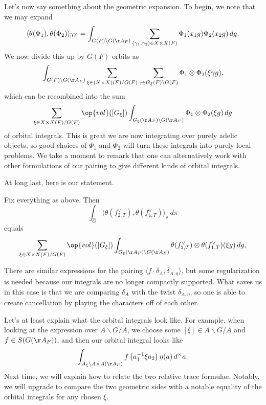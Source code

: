 \documentclass[../notes.tex]{subfiles}
\begin{document}
Let's now say something about the geometric expansion. To begin, we note that we may expand
\[\langle\theta(\Phi_1),\theta(\Phi_2)\rangle_{[G]}=\int_{G(F)\backslash G(\AA_F)}\sum_{(\gamma_1,\gamma_2)\in X\times X(F)}\Phi_1(x_1g)\Phi_2(x_2g)\,dg.\]
We now divide this up by $G(F)$ orbits as
\[\int_{G(F)\backslash G(\AA_F)}\sum_{\xi\in(X\times X)(F)/G(F)}\sum_{\gamma\in G_\xi(F)\backslash G(F)}\Phi_1\otimes\Phi_2(\xi\gamma g),\]
which can be recombined into the sum
\[\sum_{\xi\in X\times X(F)/G(F)}\op{vol}([G_\xi])\int_{G_\xi(\AA_F)\backslash G(\AA_F)}\Phi_1\otimes\Phi_2(\xi g)\,dg\]
of orbital integrals. This is great we are now integrating over purely adelic objects, so good choices of $\Phi_1$ and $\Phi_2$ will turn these integrals into purely local problems. We take a moment to remark that one can alternatively work with other formulations of our pairing to give different kinds of orbital integrals.

At long last, here is our statement.
\begin{theorem}
	Fix everything as above. Then
	\[\int_{\widehat G}\langle\theta(f_{2,T}^\lor),\theta(f_{1,T}^\lor)\rangle_\pi\,d\pi\]
	equals
	\[\sum_{\xi\in X\times X(F)/G(F)}\op{vol}([G_\xi])\int_{G_\xi(\AA_F)\backslash G(\AA_F)}\theta(f_{2,T}^\lor)\otimes\theta(f_{1,T}^\lor)(\xi g)\,dg,\]
\end{theorem}
There are similar expressions for the pairing $\langle f\cdot\delta_A,\delta_{A,\eta}\rangle$, but some regularization is needed because our integrals are no longer compactly supported. What saves us in this case is that we are comparing $\delta_A$ with the twist $\delta_{A,\eta}$, so one is able to create cancellation by playing the characters off of each other.

Let's at least explain what the orbital integrals look like. For example, when looking at the expression over $A\backslash G/A$, we choose some $[\xi]\in A\backslash G/A$ and $f\in S(G(\AA_F))$, and then our orbital integral looks like
\[\int_{A_\xi\backslash A\times A(\AA_F)}f\left(a_1^{-1}\xi a_2\right)\eta(a)\,d^\times a.\]
Next time, we will explain how to relate the two relative trace formulae. Notably, we will upgrade  to compare the two geometric sides with a notable equality of the orbital integrals for any chosen $\xi$.
\end{document}
